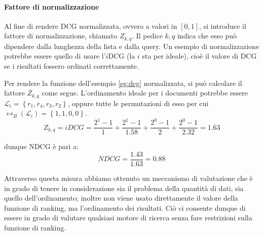 \paragraph{Fattore di normalizzazione}
Al fine di rendere DCG normalizzata, ovvero a valori in $\left[0, 1\right]$, si introduce il fattore di
normalizzazione, chiamato  $Z_{k, q}$. Il pedice $k,q$ indica che esso può dipendere dalla lunghezza
della lista e dalla query.
Un esempio di normalizzazione potrebbe essere quello di usare l'$i$DCG (la $i$ sta per ideale),
cioè il valore di DCG se i risultati fossero ordinati correttamente.

\begin{esempio}\label{eg:ndcg}
	 Per rendere la funzione dell'esempio \ref{eg:dcg}  normalizzata, si può calcolare
	 il fattore $Z_{k,q}$ come segue.
	 L'ordinamento ideale per i documenti potrebbe essere $\mathcal{L}_i = \left\{r_1, r_4, r_3, r_2\right\}$,
	 oppure tutte le permutazioni di esso per cui $\rel_B(\mathcal{L}_i)= \left\{1,1,0,0\right\}$.
	 $$
	 Z_{k,q} = iDCG = \frac{2^{1} - 1}{1} + \frac{2^{1} - 1}{1.58} + \frac{2^{0} - 1}{2} + \frac{2^{0} - 1}{2.32} = 1.63
	 $$
	 
	 dunque NDCG è pari a:
	 $$
	 NDCG = \frac{1.43}{1.63} = 0.88
	 $$
\end{esempio}

Attraverso questa misura abbiamo ottenuto un meccanismo di valutazione che è in grado di tenere in considerazione
sia il problema della quantità di dati, sia quello dell'ordinamento; inoltre  non viene
usato direttamente il valore della funzione di ranking, ma l'ordinamento dei risultati.
Ciò ci consente dunque di essere in grado di valutare qualsiasi motore di ricerca
senza fare restrizioni sulla funzione di ranking.
